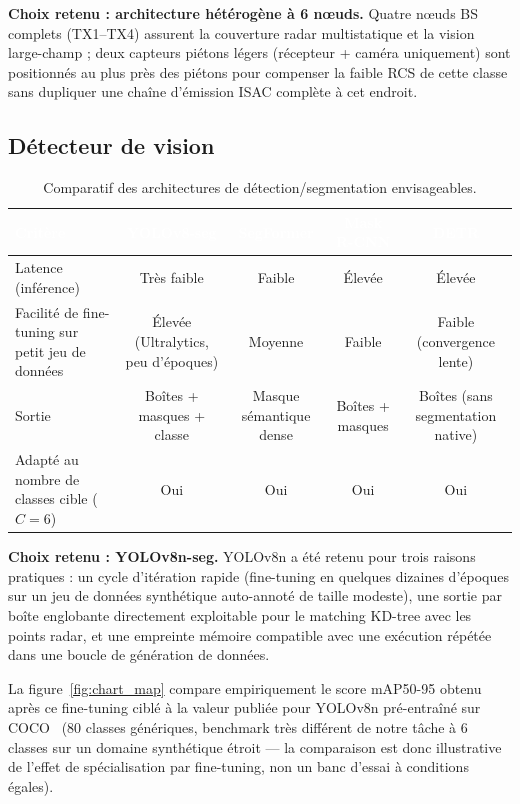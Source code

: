 \documentclass[12pt,a4paper,titlepage]{article}
\newcommand{\hd}[1]{\textcolor{white}{\textbf{#1}}}
\begin{document}
\textbf{Choix retenu : architecture hétérogène à 6 n\oe uds.} Quatre n\oe uds BS complets (TX1--TX4) assurent la couverture radar multistatique et la vision large-champ ; deux capteurs piétons légers (récepteur + caméra uniquement) sont positionnés au plus près des piétons pour compenser la faible RCS de cette classe sans dupliquer une chaîne d'émission ISAC complète à cet endroit.

\subsection{Détecteur de vision}

\begin{table}[H]
    \centering
    \caption{Comparatif des architectures de détection/segmentation envisageables.}
    \begin{tabularx}{\textwidth}{F{3.2cm}CCCC}
        \toprule
        \hd{Critère} & \hd{YOLOv8-seg} & \hd{SegFormer} & \hd{Mask R-CNN} & \hd{DETR} \\
        \midrule
        Latence (inférence) & Très faible & Faible & Élevée & Élevée \\
        Facilité de fine-tuning sur petit jeu de données & Élevée (Ultralytics, peu d'époques) & Moyenne & Faible & Faible (convergence lente) \\
        Sortie & Boîtes + masques + classe & Masque sémantique dense & Boîtes + masques & Boîtes (sans segmentation native) \\
        Adapté au nombre de classes cible ($C=6$) & Oui & Oui & Oui & Oui \\
        \bottomrule
    \end{tabularx}
\end{table}


\textbf{Choix retenu : YOLOv8n-seg.} YOLOv8n a été retenu pour trois raisons pratiques : un cycle d'itération rapide (fine-tuning en quelques dizaines d'époques sur un jeu de données synthétique auto-annoté de taille modeste), une sortie par boîte englobante directement exploitable pour le matching KD-tree avec les points radar, et une empreinte mémoire compatible avec une exécution répétée dans une boucle de génération de données.

La figure~\ref{fig:chart_map} compare empiriquement le score mAP50-95 obtenu après ce fine-tuning ciblé à la valeur publiée pour YOLOv8n pré-entraîné sur COCO~\cite{ultralytics_yolov8} (80 classes génériques, benchmark très différent de notre tâche à 6 classes sur un domaine synthétique étroit --- la comparaison est donc illustrative de l'effet de spécialisation par fine-tuning, non un banc d'essai à conditions égales).
\end{document}
